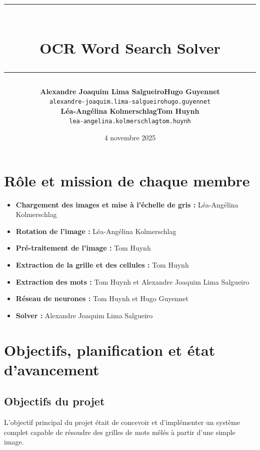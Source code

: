 \documentclass{article}
\title{\vspace{-3.0cm}
\rule{0.65\linewidth}{3pt}\\[0.7em]  %
OCR Word Search Solver\\[0.5em]
\rule{0.65\linewidth}{1pt}           %
}
\author{
    \begin{tabular}{cc}
        \small\textbf{Alexandre Joaquim Lima Salgueiro} & \small\textbf{Hugo Guyennet} \\
        \small\texttt{alexandre-joaquim.lima-salgueiro} & \small\texttt{hugo.guyennet} \\[2ex]
        \small\textbf{Léa-Angélina Kolmerschlag} & \small\textbf{Tom Huynh} \\
        \small\texttt{lea-angelina.kolmerschlag} & \small\texttt{tom.huynh}
    \end{tabular}
}
\date{4 novembre 2025}
\begin{document}
\maketitle

\begin{spacing}{0.9}
\tableofcontents
\end{spacing}



\section{Rôle et mission de chaque membre}

\begin{itemize}
    \item \textbf{Chargement des images et mise à l'échelle de gris :} Léa-Angélina Kolmerschlag
    \item \textbf{Rotation de l'image :} Léa-Angélina Kolmerschlag
    \item \textbf{Pré-traitement de l'image :} Tom Huynh
    \item \textbf{Extraction de la grille et des cellules :} Tom Huynh
    \item \textbf{Extraction des mots :} Tom Huynh et Alexandre Joaquim Lima Salgueiro
    \item \textbf{Réseau de neurones :} Tom Huynh et Hugo Guyennet
    \item \textbf{Solver :} Alexandre Joaquim Lima Salgueiro
\end{itemize}

\section{Objectifs, planification et état d'avancement}

\subsection{Objectifs du projet}
L'objectif principal du projet était de concevoir et d'implémenter un système complet capable de résoudre des grilles de mots mêlés à partir d'une simple image.
\end{document}

